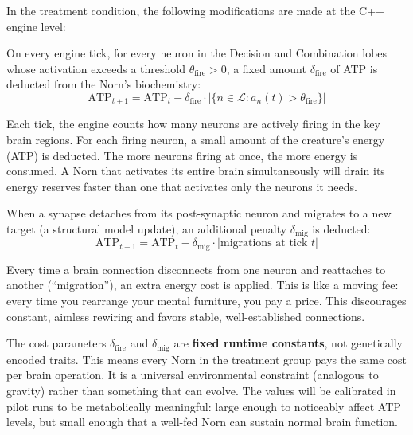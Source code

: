 \documentclass[12pt, a4paper]{article}
\begin{document}
In the treatment condition, the following modifications are made at the C++ engine level:

\begin{description}[style=nextline, font=\itshape]
  \item[Synaptic Firing Cost: ``Thinking Costs Energy'']
    On every engine tick, for every neuron in the Decision and Combination lobes whose activation exceeds a threshold $\theta_{\text{fire}} > 0$, a fixed amount $\delta_{\text{fire}}$ of ATP is deducted from the Norn's biochemistry:
    \begin{equation}
      \text{ATP}_{t+1} = \text{ATP}_t - \delta_{\text{fire}} \cdot |\{n \in \mathcal{L} : a_n(t) > \theta_{\text{fire}}\}|
      \label{eq:firing-cost}
    \end{equation}

    \begin{plainbox}
    Each tick, the engine counts how many neurons are actively firing in the key brain regions. For each firing neuron, a small amount of the creature's energy (ATP) is deducted. The more neurons firing at once, the more energy is consumed. A Norn that activates its entire brain simultaneously will drain its energy reserves faster than one that activates only the neurons it needs.
    \end{plainbox}

  \item[Synaptic Migration Penalty: ``Rewiring Costs Energy'']
    When a synapse detaches from its post-synaptic neuron and migrates to a new target (a structural model update), an additional penalty $\delta_{\text{mig}}$ is deducted:
    \begin{equation}
      \text{ATP}_{t+1} = \text{ATP}_t - \delta_{\text{mig}} \cdot |\text{migrations at tick } t|
      \label{eq:migration-cost}
    \end{equation}

    \begin{plainbox}
    Every time a brain connection disconnects from one neuron and reattaches to another (``migration''), an extra energy cost is applied. This is like a moving fee: every time you rearrange your mental furniture, you pay a price. This discourages constant, aimless rewiring and favors stable, well-established connections.
    \end{plainbox}
\end{description}

\noindent The cost parameters $\delta_{\text{fire}}$ and $\delta_{\text{mig}}$ are \textbf{fixed runtime constants}, not genetically encoded traits. This means every Norn in the treatment group pays the same cost per brain operation. It is a universal environmental constraint (analogous to gravity) rather than something that can evolve. The values will be calibrated in pilot runs to be metabolically meaningful: large enough to noticeably affect ATP levels, but small enough that a well-fed Norn can sustain normal brain function.
\end{document}
